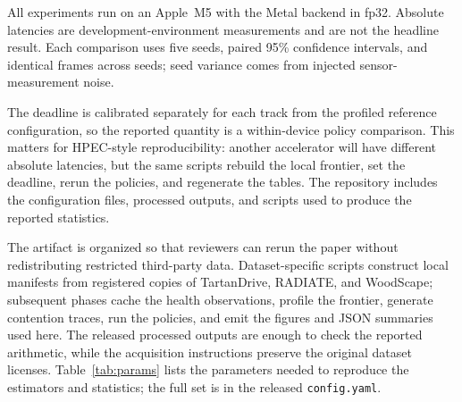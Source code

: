 \documentclass[conference]{IEEEtran}
\begin{document}
All experiments run on an Apple~M5 with the Metal backend in fp32.
Absolute latencies are development-environment measurements and are
not the headline result. Each comparison uses five seeds, paired
95\% confidence intervals, and identical frames across seeds; seed
variance comes from injected sensor-measurement noise.

The deadline is calibrated separately for each track from the
profiled reference configuration, so the reported quantity is a
within-device policy comparison. This matters for HPEC-style
reproducibility: another accelerator will have different absolute
latencies, but the same scripts rebuild the local frontier, set the
deadline, rerun the policies, and regenerate the tables. The
repository includes the configuration files, processed outputs, and
scripts used to produce the reported statistics.

The artifact is organized so that reviewers can rerun the paper
without redistributing restricted third-party data. Dataset-specific
scripts construct local manifests from registered copies of
TartanDrive, RADIATE, and WoodScape; subsequent phases cache the
health observations, profile the frontier, generate contention
traces, run the policies, and emit the figures and JSON summaries
used here. The released processed outputs are enough to check the
reported arithmetic, while the acquisition instructions preserve
the original dataset licenses. Table~\ref{tab:params} lists the
parameters needed to reproduce the estimators and statistics; the
full set is in the released \texttt{config.yaml}.
\end{document}
